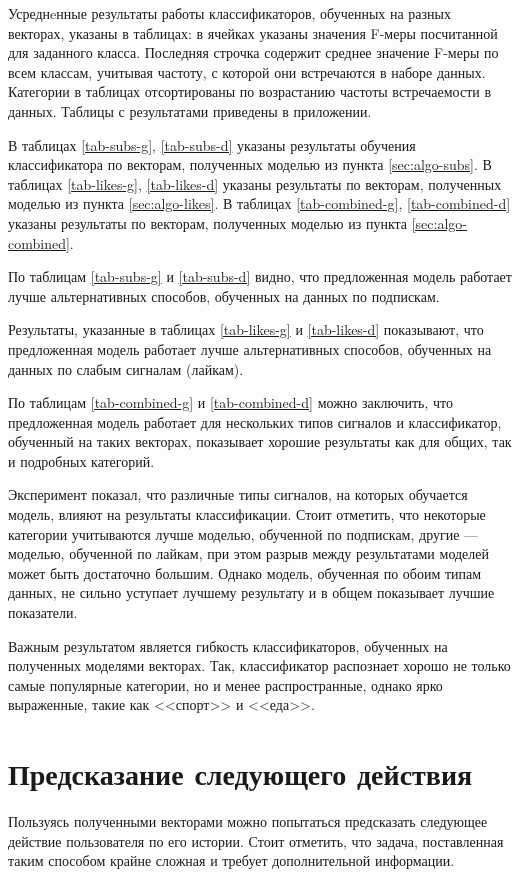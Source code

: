 \documentclass[times,specification,annotation]{itmo-student-thesis}
\begin{document}
Усреднeнные результаты работы классификаторов, обученных на разных векторах, указаны в таблицах: в ячейках указаны значения F-меры посчитанной для заданного класса. Последняя строчка содержит среднее значение F-меры по всем классам, учитывая частоту, с которой они встречаются в наборе данных. Категории в таблицах отсортированы по возрастанию частоты встречаемости в данных. Таблицы с результатами приведены в приложении.

В таблицах \ref{tab-subs-g}, \ref{tab-subs-d} указаны результаты обучения классификатора по векторам, полученных моделью из пункта \ref{sec:algo-subs}. В таблицах \ref{tab-likes-g}, \ref{tab-likes-d} указаны результаты по векторам, полученных моделью из пункта \ref{sec:algo-likes}. В таблицах \ref{tab-combined-g}, \ref{tab-combined-d} указаны результаты по векторам, полученных моделью из пункта \ref{sec:algo-combined}. 

По таблицам \ref{tab-subs-g} и \ref{tab-subs-d} видно, что предложенная модель работает лучше альтернативных способов, обученных на данных по подпискам.  

Результаты, указанные в таблицах \ref{tab-likes-g} и \ref{tab-likes-d} показывают, что предложенная модель работает лучше альтернативных способов, обученных на данных по слабым сигналам (лайкам).

По таблицам \ref{tab-combined-g} и \ref{tab-combined-d} можно заключить, что предложенная модель работает для нескольких типов сигналов и классификатор, обученный на таких векторах, показывает хорошие результаты как для общих, так и подробных категорий.

Эксперимент показал, что различные типы сигналов, на которых обучается модель, влияют на результаты классификации.  
Стоит отметить, что некоторые категории учитываются лучше моделью, обученной по подпискам, другие --- моделью, обученной по лайкам, при этом разрыв между результатами моделей может быть достаточно большим. Однако модель, обученная по обоим типам данных, не сильно уступает лучшему результату и в общем показывает лучшие показатели.

Важным результатом является гибкость классификаторов, обученных на полученных моделями векторах. Так, классификатор распознает хорошо не только самые популярные категории, но и менее распространные, однако ярко выраженные, такие как <<спорт>> и <<еда>>. 

\section{Предсказание следующего действия}\label{sec:next-action}
Пользуясь полученными векторами можно попытаться предсказать следующее действие пользователя по его истории. Стоит отметить, что задача, поставленная таким способом крайне сложная и требует дополнительной информации.
\end{document}
